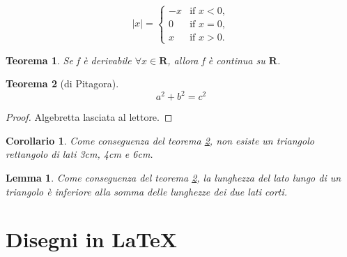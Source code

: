 \documentclass[a4paper, 12pt]{article} %
\theoremstyle{plain} %
\newtheorem{teorema}{Teorema}
\newtheorem{corollario}{Corollario}[teorema]
\newtheorem{lemma}{Lemma}[teorema]
\begin{document}
\begin{equation}
    |x| = \left\{
    \begin{array}{rl}
    -x & \text{if } x < 0, \\
    0 & \text{if } x = 0, \\
    x & \text{if } x > 0.
    \end{array} \right.
\end{equation}

\begin{teorema}
    Se f è derivabile $\forall x \in \mathbf{R}$, allora f è continua su $\mathbf{R}$.
\end{teorema}

\begin{teorema}[di Pitagora]
\label{pitagora}
\begin{equation*}
    a^2 + b^2 = c^2 
\end{equation*}
\end{teorema}
\begin{proof}
    Algebretta lasciata al lettore.
\end{proof}

\begin{corollario}
    Come conseguenza del teorema \ref{pitagora}, non esiste un triangolo rettangolo di lati 3cm, 4cm e 6cm.
\end{corollario}

\begin{lemma}
    Come conseguenza del teorema \ref{pitagora}, la lunghezza del lato lungo di un triangolo è inferiore alla somma delle lunghezze dei due lati corti.
\end{lemma}


\newpage
\section{Disegni in \LaTeX}

\end{document}
